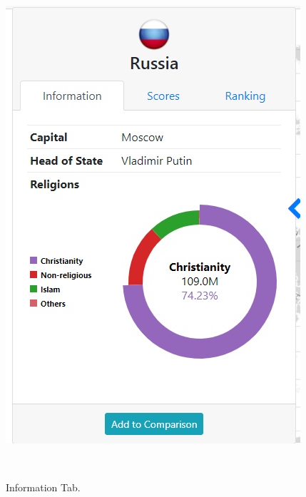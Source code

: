 \documentclass[12pt, fullpage,letterpaper]{article}
\begin{document}
\begin{figure}[h!]
    \begin{minipage}{0.31\linewidth}
        \centering
        \includegraphics[width=\textwidth]{figs/info1.jpg}
        \caption{Information Tab.}
        \label{fig:info1}
    \end{minipage}
    \hfill\
    \begin{minipage}{0.31\linewidth}
        \centering

\end{minipage}
\end{figure}
\end{document}
